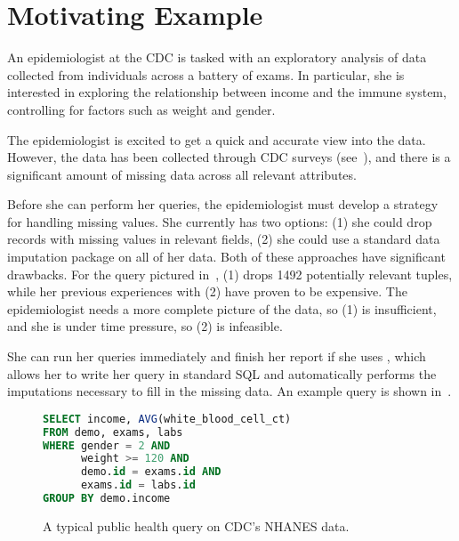 \section{Motivating Example}
An epidemiologist at the CDC is tasked with an 
exploratory analysis of data collected from individuals across
a battery of exams. In particular, she is interested in exploring
the relationship between income and the immune system,
controlling for factors such as weight and gender.

The epidemiologist is excited
to get a quick and accurate view into the data. However,
the data has been collected through CDC surveys (see~),
and there is a significant amount of missing data across all
relevant attributes. 

Before she can perform her queries, the epidemiologist must develop a strategy
for handling missing values. She currently has two options:
(1) she could drop records with missing values in relevant fields,
(2) she could use a standard data imputation package on all of her data. Both of these
approaches have significant drawbacks. For the query pictured in~, 
(1) drops 1492 potentially relevant tuples,
while her previous experiences with (2) have proven to be expensive. The epidemiologist needs a more complete picture
of the data, so (1) is insufficient, and she is under time pressure, so (2)
is infeasible.

She can run her queries immediately and finish her report if
she uses \ProjectName{}, which allows her to write her
query in standard SQL and automatically performs the imputations necessary to fill in the missing data.
An example query is shown in~.

\begin{figure}
\begin{lstlisting}[language=SQL]
SELECT income, AVG(white_blood_cell_ct)
FROM demo, exams, labs
WHERE gender = 2 AND 
      weight >= 120 AND
      demo.id = exams.id AND 
      exams.id = labs.id
GROUP BY demo.income
\end{lstlisting}
\caption{A typical public health query on CDC's NHANES data.}
\label{fig:example-query}
\end{figure}

